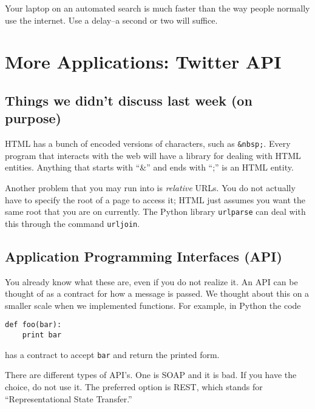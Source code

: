 \documentclass[12pt,letter]{article}
\begin{document}
Your laptop on an automated search is much faster than the way people
normally use the internet. Use a delay--a second or two will suffice. 


\section{More Applications: Twitter API}

\subsection{Things we didn't discuss last week (on purpose)}

HTML has a bunch of encoded versions of characters, such as
\texttt{\&nbsp;}. Every program that interacts with the web will have a
library for dealing with HTML entities. Anything that starts with
``\&'' and ends with ``;'' is an HTML entity. 

Another problem that you may run into is \emph{relative} URLs. You do
not actually have to specify the root of a page to access it; HTML
just assumes you want the same root that you are on currently. The
Python library \texttt{urlparse} can deal with this through the
command \texttt{urljoin}. 

\subsection{Application Programming Interfaces (API)}

You already know what these are, even if you do not realize it. An API
can be thought of as a contract for how a message is passed. We
thought about this on a smaller scale when we implemented
functions. For example, in Python the code
\begin{verbatim}
def foo(bar):
    print bar
\end{verbatim}
has a contract to accept \texttt{bar} and return the printed form. 

There are different types of API's. One is SOAP and it is bad. If you
have the choice, do not use it. The preferred option is REST, which
stands for ``Representational State Transfer.''\footnotemark
{} 
\end{document}

